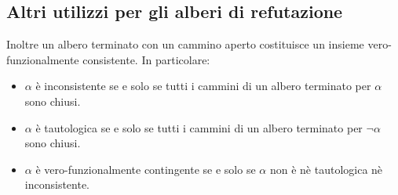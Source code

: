 \subsection{Altri utilizzi per gli alberi di refutazione}
Inoltre un albero terminato con un cammino aperto costituisce  un insieme vero-funzionalmente consistente. In particolare:
\begin{itemize}
\item $\alpha$ \`e inconsistente se e solo se tutti i cammini di un albero terminato per $\alpha$ sono chiusi.
\item $\alpha$ \`e tautologica se e solo se tutti i cammini di un albero terminato per $\neg\alpha$ sono chiusi.
\item $\alpha$ \`e vero-funzionalmente contingente se e solo se $\alpha$ non \`e n\`e tautologica n\`e inconsistente.
\end{itemize}